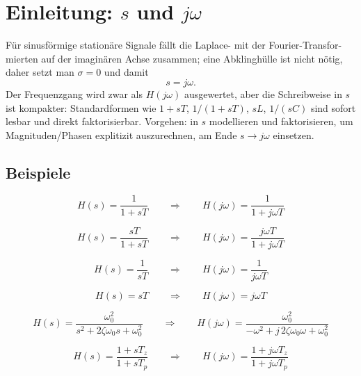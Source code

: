 \section*{Einleitung: \(s\) und \(j\omega\)}

Für sinusförmige stationäre Signale fällt die Laplace- mit der Fourier-Transfor- mierten auf der imaginären Achse zusammen; eine Abklinghülle ist nicht nötig, daher setzt man \(\sigma=0\) und damit
\[ s = j\omega. \]
Der Frequenzgang wird zwar als \(H(j\omega)\) ausgewertet, aber die Schreibweise in \(s\) ist kompakter: Standardformen wie \(1+sT\), \(1/(1+sT)\), \(sL\), \(1/(sC)\) sind sofort lesbar und direkt faktorisierbar. Vorgehen: in \(s\) modellieren und faktorisieren, um Magnituden/Phasen explitizit auszurechnen, am Ende \(s\to j\omega\) einsetzen.


\subsection*{Beispiele}

$$ H(s)=\frac{1}{1+sT}\qquad\Rightarrow\qquad H(j\omega)=\frac{1}{1+j\omega T} $$

$$ H(s)=\frac{sT}{1+sT}\qquad\Rightarrow\qquad H(j\omega)=\frac{j\omega T}{1+j\omega T} $$

$$ H(s)=\frac{1}{sT}\qquad\Rightarrow\qquad H(j\omega)=\frac{1}{j\omega T} $$

$$ H(s)=sT\qquad\Rightarrow\qquad H(j\omega)=j\omega T $$

$$ H(s)=\frac{\omega_0^2}{s^2+2\zeta \omega_0 s+\omega_0^2}\qquad\Rightarrow\qquad H(j\omega)=\frac{\omega_0^2}{-\omega^2+j\,2\zeta \omega_0 \omega+\omega_0^2} $$

$$ H(s)=\frac{1+sT_{z}}{1+sT_{p}}\qquad\Rightarrow\qquad H(j\omega)=\frac{1+j\omega T_{z}}{1+j\omega T_{p}} $$

\newpage